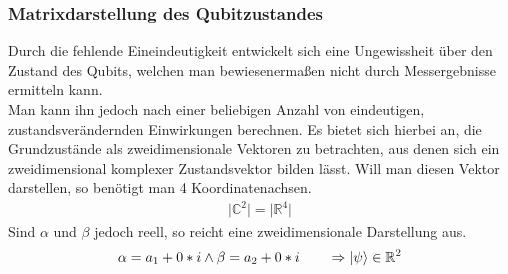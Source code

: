 \documentclass[12pt]{report}
\begin{document}
\subsubsection{Matrixdarstellung des Qubitzustandes}		%
	Durch die fehlende Eineindeutigkeit entwickelt sich eine Ungewissheit über den Zustand des Qubits, welchen man bewiesenermaßen nicht durch Messergebnisse ermitteln kann.\\
	Man kann ihn jedoch nach einer beliebigen Anzahl von eindeutigen, zustandsverändernden Einwirkungen berechnen. Es bietet sich hierbei an, die Grundzustände als zweidimensionale Vektoren zu betrachten, aus denen sich ein zweidimensional komplexer Zustandsvektor bilden lässt. Will man diesen Vektor darstellen, so benötigt man 4 Koordinatenachsen. 
	\begin{align*} \vert \mathbb{C}^2 \vert = \vert \mathbb{R}^4 \vert \end{align*}
Sind $\alpha$ und $\beta$ jedoch reell, so reicht eine zweidimensionale Darstellung aus.
	\begin{align*}  \alpha = a_1+0*i \wedge \beta = a_2+0*i \qquad \Rightarrow \ket{\psi} \in \mathbb{R}^2 
	\end{align*}
	
\end{document}
